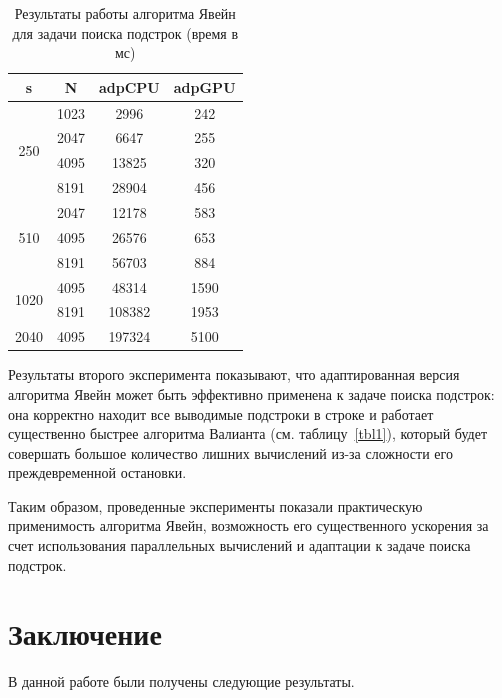 \documentclass[14pt]{matmex-diploma-custom}
\begin{document}
\begin{table}[h]

\begin{center}
\caption{Результаты работы алгоритма Явейн для задачи поиска подстрок (время в мс)}
\label{tbl3}
    \begin{tabular}{ ||c||c||c|c|| } 
    \hline
    s & N & adpCPU &  adpGPU \\
    \hline
    \multirow{4}{2em}{250} & 1023 & 2996 & 242 \\ 
    & 2047 & 6647 & 255\\ 
    & 4095 & 13825 & 320\\ 
    & 8191 & 28904 & 456\\ 
    \hline
    \multirow{3}{2em}{510} & 2047 & 12178 & 583\\
    & 4095 & 26576 & 653\\
    & 8191 & 56703 & 884\\ 
    \hline
    \multirow{2}{2em}{1020} & 4095 & 48314 & 1590 \\
    & 8191 & 108382 & 1953\\ 
    \hline
    2040 & 4095 & 197324 & 5100\\ 
    \hline
    \end{tabular}
\end{center}

\end{table}


Результаты второго эксперимента показывают, что адаптированная версия алгоритма Явейн может быть эффективно применена к задаче поиска подстрок: она корректно находит все выводимые подстроки в строке и работает существенно быстрее алгоритма Валианта (см. таблицу~\ref{tbl1}), который будет совершать большое количество лишних вычислений из-за сложности его преждевременной остановки.

Таким образом, проведенные эксперименты показали практическую применимость алгоритма Явейн, возможность его существенного ускорения за счет использования параллельных вычислений и адаптации к задаче поиска подстрок.

\section{Заключение}
В данной работе были получены следующие результаты.
\end{document}
